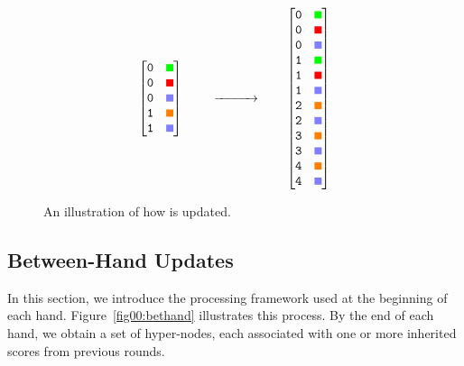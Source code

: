 \begin{figure}[h]
  \centering
\[
\begin{bmatrix}
\py{0} & \tikz\fill[green] (0,0) rectangle (0.2,0.2); \\
\py{0} & \tikz\fill[red] (0,0) rectangle (0.2,0.2); \\
\py{0} & \tikz\fill[fill=blue!50] (0,0) rectangle (0.2,0.2); \\
\py{1} & \tikz\fill[orange] (0,0) rectangle (0.2,0.2); \\
\py{1} & \tikz\fill[fill=blue!50] (0,0) rectangle (0.2,0.2); 
\end{bmatrix}
\;
\qquad
\xrightarrow{\hspace{1cm}}
\qquad
\begin{bmatrix}
\py{0} & \tikz\fill[green] (0,0) rectangle (0.2,0.2); \\
\py{0} & \tikz\fill[red] (0,0) rectangle (0.2,0.2); \\
\py{0} & \tikz\fill[fill=blue!50] (0,0) rectangle (0.2,0.2); \\
\py{1} & \tikz\fill[green] (0,0) rectangle (0.2,0.2); \\
\py{1} & \tikz\fill[red] (0,0) rectangle (0.2,0.2); \\
\py{1} & \tikz\fill[fill=blue!50] (0,0) rectangle (0.2,0.2); \\
\py{2} & \tikz\fill[orange] (0,0) rectangle (0.2,0.2); \\
\py{2} & \tikz\fill[fill=blue!50] (0,0) rectangle (0.2,0.2); \\
\py{3} & \tikz\fill[orange] (0,0) rectangle (0.2,0.2); \\
\py{3} & \tikz\fill[fill=blue!50] (0,0) rectangle (0.2,0.2); \\
\py{4} & \tikz\fill[orange] (0,0) rectangle (0.2,0.2); \\
\py{4} & \tikz\fill[fill=blue!50] (0,0) rectangle (0.2,0.2);
\end{bmatrix}
\]
  \caption{An illustration of how  is updated.}
  \label{fig:t_fgm}
\end{figure}



\subsection{Between-Hand Updates}\label{sec:bethand}
In this section, we introduce the processing framework used at the beginning of each hand. Figure~\ref{fig00:bethand} illustrates this process. By the end of each hand, we obtain a set of hyper-nodes, each associated with one or more inherited scores from previous rounds.

